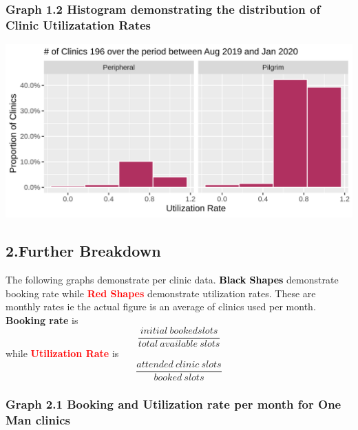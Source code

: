 \documentclass[]{article}
\begin{document}
\hypertarget{graph-1.2-histogram-demonstrating-the-distribution-of-clinic-utilizatation-rates}{%
\subsubsection{Graph 1.2 Histogram demonstrating the distribution of
Clinic Utilizatation
Rates}\label{graph-1.2-histogram-demonstrating-the-distribution-of-clinic-utilizatation-rates}}

\begin{center}\includegraphics{LF2_files/figure-latex/unnamed-chunk-5-1} \end{center}

\hypertarget{further-breakdown}{%
\subsection{2.Further Breakdown}\label{further-breakdown}}

The following graphs demonstrate per clinic data.
\textcolor{black}{\textbf{Black Shapes}} demonstrate booking rate while
\textcolor{red}{\textbf{Red Shapes}} demonstrate utilization rates.
These are monthly rates ie the actual figure is an average of clinics
used per month. \textbf{Booking rate} is
\[\frac{initial\ booked slots}{total\ available\ slots}\] while
\textcolor{red}{\textbf{Utilization Rate}} is
\[\frac{attended \ clinic\  slots}{booked\ slots}\]

\hypertarget{graph-2.1-booking-and-utilization-rate-per-month-for-one-man-clinics}{%
\subsubsection{Graph 2.1 Booking and Utilization rate per month for One
Man
clinics}\label{graph-2.1-booking-and-utilization-rate-per-month-for-one-man-clinics}}
\end{document}

